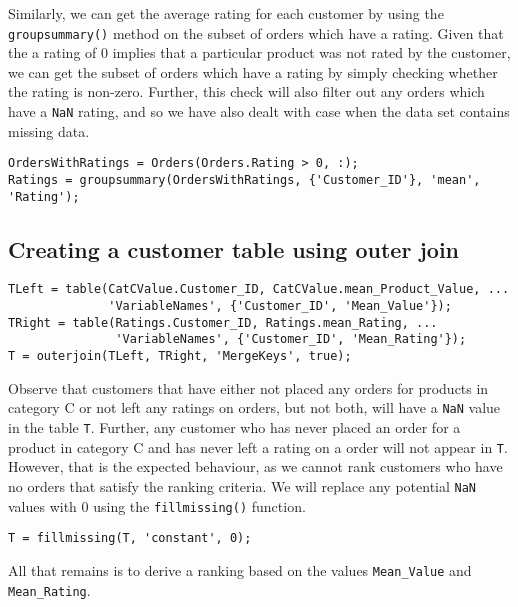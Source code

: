 \noindent
Similarly, we can get the average rating for each customer by using the \lstinline|groupsummary()| method on the subset of orders which have a rating. Given that the a rating of 0 implies that a particular product was not rated by the customer, we can get the subset of orders which have a rating by simply checking whether the rating is non-zero. Further, this check will also filter out any orders which have a \lstinline|NaN| rating, and so we have also dealt with case when the data set contains missing data.

\begin{lstlisting}
OrdersWithRatings = Orders(Orders.Rating > 0, :);
Ratings = groupsummary(OrdersWithRatings, {'Customer_ID'}, 'mean', 'Rating');
\end{lstlisting}

\newpage
\subsection{Creating a customer table using outer join}


\begin{lstlisting}
TLeft = table(CatCValue.Customer_ID, CatCValue.mean_Product_Value, ...
              'VariableNames', {'Customer_ID', 'Mean_Value'});
TRight = table(Ratings.Customer_ID, Ratings.mean_Rating, ...
               'VariableNames', {'Customer_ID', 'Mean_Rating'});
T = outerjoin(TLeft, TRight, 'MergeKeys', true);
\end{lstlisting}

\noindent
Observe that customers that have either not placed any orders for products in category C or not left any ratings on orders, but not both, will have a \lstinline|NaN| value in the table \lstinline|T|. Further, any customer who has never placed an order for a product in category C and has never left a rating on a order will not appear in \lstinline|T|. However, that is the expected behaviour, as we cannot rank customers who have no orders that satisfy the ranking criteria. We will replace any potential \lstinline|NaN| values with 0 using the \lstinline|fillmissing()| function.

\begin{lstlisting}
T = fillmissing(T, 'constant', 0);
\end{lstlisting}

\noindent
All that remains is to derive a ranking based on the values \lstinline|Mean_Value| and \lstinline|Mean_Rating|. \\

